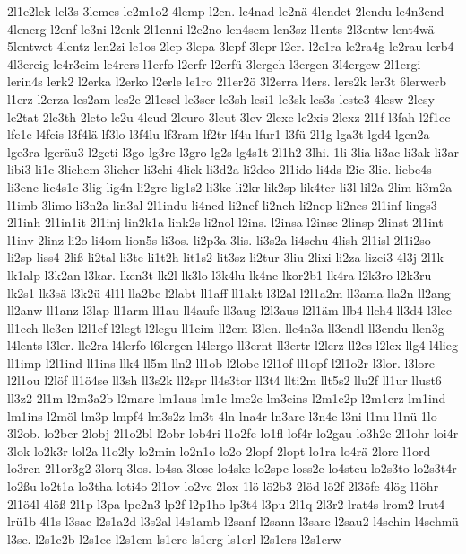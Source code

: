 {2l1e2lek
lel3s
3lemes
le2m1o2
4lemp
l2en.
le4nad
le2nä
4lendet
2lendu
le4n3end
4lenerg
l2enf
le3ni
l2enk
2l1enni
l2e2no
len4sem
len3sz
l1ents
2l3entw
lent4wä
5lentwet
4lentz
len2zi
le1os
2lep
3lepa
3lepf
3lepr
l2er.
l2e1ra
le2ra4g
le2rau
lerb4
4l3ereig
le4r3eim
le4rers
l1erfo
l2erfr
l2erfü
3lergeh
l3ergen
3l4ergew
2l1ergi
lerin4s
lerk2
l2erka
l2erko
l2erle
le1ro
2l1er2ö
3l2erra
l4ers.
lers2k
ler3t
6lerwerb
l1erz
l2erza
les2am
les2e
2l1esel
le3ser
le3sh
lesi1
le3sk
les3s
leste3
4lesw
2lesy
le2tat
2le3th
2leto
le2u
4leud
2leuro
3leut
3lev
2lexe
le2xis
2lexz
2l1f
l3fah
l2f1ec
lfe1e
l4feis
l3f4lä
lf3lo
l3f4lu
lf3ram
lf2tr
lf4u
lfur1
l3fü
2l1g
lga3t
lgd4
lgen2a
lge3ra
lgeräu3
l2geti
l3go
lg3re
l3gro
lg2s
lg4s1t
2l1h2
3lhi.
1li
3lia
li3ac
li3ak
li3ar
libi3
li1c
3lichem
3licher
li3chi
4lick
li3d2a
li2deo
2l1ido
li4ds
l2ie
3lie.
liebe4s
li3ene
lie4s1c
3lig
lig4n
li2gre
lig1s2
li3ke
li2kr
lik2sp
lik4ter
li3l
lil2a
2lim
li3m2a
l1imb
3limo
li3n2a
lin3al
2l1indu
li4ned
li2nef
li2neh
li2nep
li2nes
2l1inf
lings3
2l1inh
2l1in1it
2l1inj
lin2k1a
link2s
li2nol
l2ins.
l2insa
l2insc
2linsp
2linst
2l1int
l1inv
2linz
li2o
li4om
lion5s
li3os.
li2p3a
3lis.
li3s2a
li4schu
4lish
2l1isl
2l1i2so
li2sp
liss4
2liß
li2tal
li3te
li1t2h
lit1s2
lit3sz
li2tur
3liu
2lixi
li2za
lizei3
4l3j
2l1k
lk1alp
l3k2an
l3kar.
lken3t
lk2l
lk3lo
l3k4lu
lk4ne
lkor2b1
lk4ra
l2k3ro
l2k3ru
lk2s1
lk3sä
l3k2ü
4l1l
lla2be
l2labt
ll1aff
ll1akt
l3l2al
l2l1a2m
ll3ama
lla2n
ll2ang
ll2anw
ll1anz
l3lap
ll1arm
ll1au
ll4aufe
ll3aug
l2l3aus
l2l1äm
llb4
llch4
ll3d4
l3lec
ll1ech
lle3en
l2l1ef
l2legt
l2legu
ll1eim
ll2em
l3len.
lle4n3a
ll3endl
ll3endu
llen3g
l4lents
l3ler.
lle2ra
l4lerfo
l6lergen
l4lergo
ll3ernt
ll3ertr
l2lerz
ll2es
l2lex
llg4
l4lieg
ll1imp
l2l1ind
ll1ins
llk4
ll5m
lln2
ll1ob
l2lobe
l2l1of
ll1opf
l2l1o2r
l3lor.
l3lore
l2l1ou
l2löf
ll1ö4se
ll3sh
ll3s2k
ll2spr
ll4s3tor
ll3t4
llti2m
llt5s2
llu2f
ll1ur
llust6
ll3z2
2l1m
l2m3a2b
l2marc
lm1aus
lm1c
lme2e
lm3eins
l2m1e2p
l2m1erz
lm1ind
lm1ins
l2möl
lm3p
lmpf4
lm3s2z
lm3t
4ln
lna4r
ln3are
l3n4e
l3ni
l1nu
l1nü
1lo
3l2ob.
lo2ber
2lobj
2l1o2bl
l2obr
lob4ri
l1o2fe
lo1fl
lof4r
lo2gau
lo3h2e
2l1ohr
loi4r
3lok
lo2k3r
lol2a
l1o2ly
lo2min
lo2n1o
lo2o
2lopf
2lopt
lo1ra
lo4rä
2lorc
l1ord
lo3ren
2l1or3g2
3lorq
3los.
lo4sa
3lose
lo4ske
lo2spe
loss2e
lo4steu
lo2s3to
lo2s3t4r
lo2ßu
lo2t1a
lo3tha
loti4o
2l1ov
lo2ve
2lox
1lö
lö2b3
2löd
lö2f
2l3öfe
4lög
l1öhr
2l1ö4l
4löß
2l1p
l3pa
lpe2n3
lp2f
l2p1ho
lp3t4
l3pu
2l1q
2l3r2
lrat4s
lrom2
lrut4
lrü1b
4l1s
l3sac
l2s1a2d
l3s2al
l4s1amb
l2sanf
l2sann
l3sare
l2sau2
l4schin
l4schmü
l3se.
l2s1e2b
l2s1ec
l2s1em
ls1ere
ls1erg
ls1erl
l2s1ers
l2s1erw
}
